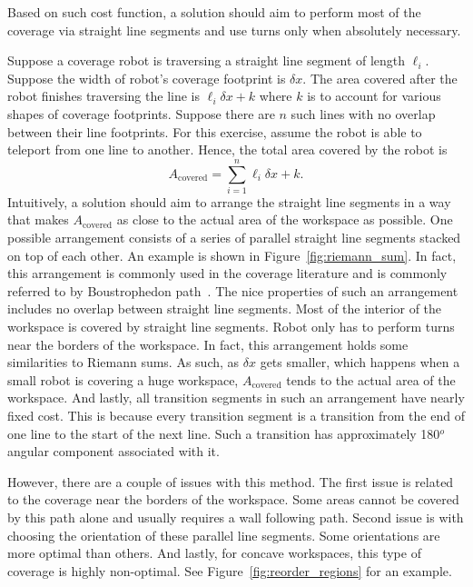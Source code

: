 \documentclass[../main.tex]{subfiles}
\begin{document}
Based on such cost function, a solution should aim to perform most of the coverage via straight line segments and use turns only when absolutely necessary.

Suppose a coverage robot is traversing a straight line segment of length $\ell_i$. Suppose the width of robot's coverage footprint is $\delta x$. The area covered after the robot finishes traversing the line is $\ell_i\delta x+k$ where $k$ is to account for various shapes of coverage footprints. Suppose there are $n$ such lines with no overlap between their line footprints. For this exercise, assume the robot is able to teleport from one line to another. Hence, the total area covered by the robot is
\begin{equation}
	A_{\text{covered}}=\sum_{i=1}^n\ell_i\delta x + k.
\end{equation}
Intuitively, a solution should aim to arrange the straight line segments in a way that makes $A_{\text{covered}}$ as close to the actual area of the workspace as possible. One possible arrangement consists of a series of parallel straight line segments stacked on top of each other. An example is shown in Figure~\ref{fig:riemann_sum}. In fact, this arrangement is commonly used in the coverage literature and is commonly referred to by Boustrophedon path~\cite{Choset1998coverage}. The nice properties of such an arrangement includes no overlap between straight line segments. Most of the interior of the workspace is covered by straight line segments. Robot only has to perform turns near the borders of the workspace. In fact, this arrangement holds some similarities to Riemann sums. As such, as $\delta x$ gets smaller, which happens when a small robot is covering a huge workspace, $A_{\text{covered}}$ tends to the actual area of the workspace. And lastly, all transition segments in such an arrangement have nearly fixed cost. This is because every transition segment is a transition from the end of one line to the start of the next line. Such a transition has approximately 180$^o$ angular component associated with it.


However, there are a couple of issues with this method. The first issue is related to the coverage near the borders of the workspace. Some areas cannot be covered by this path alone and usually requires a wall following path. Second issue is with choosing the orientation of these parallel line segments. Some orientations are more optimal than others. And lastly, for concave workspaces, this type of coverage is highly non-optimal. See Figure~\ref{fig:reorder_regions} for an example.
\end{document}
